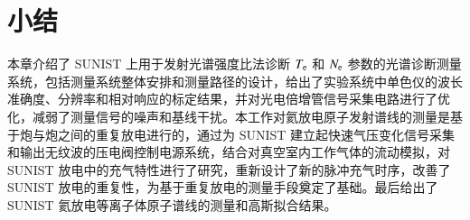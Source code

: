 \section{小结}

本章介绍了 SUNIST 上用于发射光谱强度比法诊断 $T_{\rm e}$ 和 $N_{\rm e}$ 参数的光谱诊断测量系统，包括测量系统整体安排和测量路径的设计，给出了实验系统中单色仪的波长准确度、分辨率和相对响应的标定结果，并对光电倍增管信号采集电路进行了优化，减弱了测量信号的噪声和基线干扰。本工作对氦放电原子发射谱线的测量是基于炮与炮之间的重复放电进行的，通过为 SUNIST 建立起快速气压变化信号采集和输出无纹波的压电阀控制电源系统，结合对真空室内工作气体的流动模拟，对 SUNIST 放电中的充气特性进行了研究，重新设计了新的脉冲充气时序，改善了 SUNIST 放电的重复性，为基于重复放电的测量手段奠定了基础。最后给出了 SUNIST 氦放电等离子体原子谱线的测量和高斯拟合结果。
